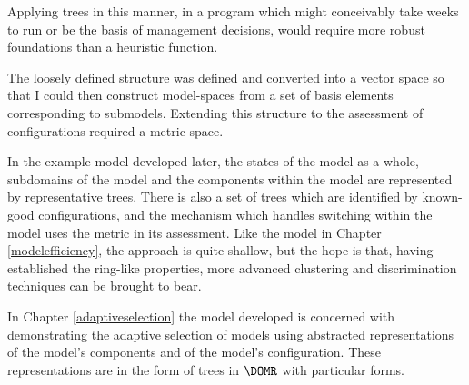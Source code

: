 Applying trees in this manner, in a program which might conceivably
take weeks to run or be the basis of management decisions, would
require more robust foundations than a heuristic function.

The loosely defined structure was defined and converted into a vector
space so that I could then construct model-spaces from a set of basis
elements corresponding to submodels. Extending this structure to the
assessment of configurations required a metric space.

In the example model developed later, the states of the model as a
whole, subdomains of the model and the components within the model are
represented by representative trees.  There is also a set of trees
which are identified by known-good configurations, and the
mechanism which handles switching within the model uses the metric in
its assessment.  Like the model in Chapter \ref{modelefficiency}, the
approach is quite shallow, but the hope is that, having established
the ring-like properties, more advanced clustering and
discrimination techniques can be brought to bear.

In Chapter \ref{adaptiveselection} the model developed is concerned with
demonstrating the adaptive selection of models using abstracted
representations of the model's components and of the model's
configuration. These representations are in the form of trees in
$\DOMR$ with particular forms.






